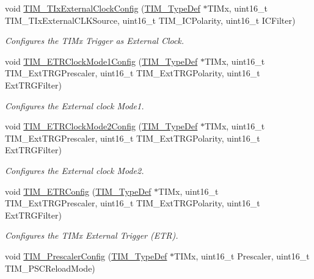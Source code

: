\begin{DoxyCompactItemize}
void \mbox{\hyperlink{group___t_i_m___exported___functions_gaf460e7d9c9969044e364130e209937fc}{T\+I\+M\+\_\+\+T\+Ix\+External\+Clock\+Config}} (\mbox{\hyperlink{struct_t_i_m___type_def}{T\+I\+M\+\_\+\+Type\+Def}} $\ast$T\+I\+Mx, uint16\+\_\+t T\+I\+M\+\_\+\+T\+Ix\+External\+C\+L\+K\+Source, uint16\+\_\+t T\+I\+M\+\_\+\+I\+C\+Polarity, uint16\+\_\+t I\+C\+Filter)
\begin{DoxyCompactList}\small\item\em Configures the T\+I\+Mx Trigger as External Clock. \end{DoxyCompactList}\item 
void \mbox{\hyperlink{group___t_i_m___exported___functions_ga47c05638b93aabcd641dbc8859e1b2df}{T\+I\+M\+\_\+\+E\+T\+R\+Clock\+Mode1\+Config}} (\mbox{\hyperlink{struct_t_i_m___type_def}{T\+I\+M\+\_\+\+Type\+Def}} $\ast$T\+I\+Mx, uint16\+\_\+t T\+I\+M\+\_\+\+Ext\+T\+R\+G\+Prescaler, uint16\+\_\+t T\+I\+M\+\_\+\+Ext\+T\+R\+G\+Polarity, uint16\+\_\+t Ext\+T\+R\+G\+Filter)
\begin{DoxyCompactList}\small\item\em Configures the External clock Mode1. \end{DoxyCompactList}\item 
void \mbox{\hyperlink{group___t_i_m___exported___functions_ga0a9cbcbab32326cbbdaf4c111f59ec20}{T\+I\+M\+\_\+\+E\+T\+R\+Clock\+Mode2\+Config}} (\mbox{\hyperlink{struct_t_i_m___type_def}{T\+I\+M\+\_\+\+Type\+Def}} $\ast$T\+I\+Mx, uint16\+\_\+t T\+I\+M\+\_\+\+Ext\+T\+R\+G\+Prescaler, uint16\+\_\+t T\+I\+M\+\_\+\+Ext\+T\+R\+G\+Polarity, uint16\+\_\+t Ext\+T\+R\+G\+Filter)
\begin{DoxyCompactList}\small\item\em Configures the External clock Mode2. \end{DoxyCompactList}\item 
void \mbox{\hyperlink{group___t_i_m___exported___functions_ga8bdde400b7a30f3e747fe8e4962c0abe}{T\+I\+M\+\_\+\+E\+T\+R\+Config}} (\mbox{\hyperlink{struct_t_i_m___type_def}{T\+I\+M\+\_\+\+Type\+Def}} $\ast$T\+I\+Mx, uint16\+\_\+t T\+I\+M\+\_\+\+Ext\+T\+R\+G\+Prescaler, uint16\+\_\+t T\+I\+M\+\_\+\+Ext\+T\+R\+G\+Polarity, uint16\+\_\+t Ext\+T\+R\+G\+Filter)
\begin{DoxyCompactList}\small\item\em Configures the T\+I\+Mx External Trigger (E\+TR). \end{DoxyCompactList}\item 
void \mbox{\hyperlink{group___t_i_m___exported___functions_ga45c6fd9041baf7f64c121e0172f305c7}{T\+I\+M\+\_\+\+Prescaler\+Config}} (\mbox{\hyperlink{struct_t_i_m___type_def}{T\+I\+M\+\_\+\+Type\+Def}} $\ast$T\+I\+Mx, uint16\+\_\+t Prescaler, uint16\+\_\+t T\+I\+M\+\_\+\+P\+S\+C\+Reload\+Mode)

\end{DoxyCompactItemize}

